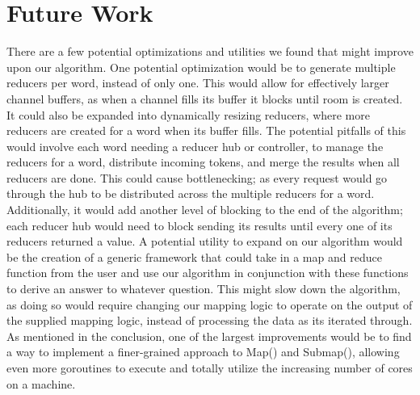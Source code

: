 \documentclass[report]{IEEEtran}
\begin{document}
\section{Future Work}

There are a few potential optimizations and utilities we found that might improve upon our algorithm. One potential optimization would be to generate multiple reducers per word, instead of only one. This would allow for effectively larger channel buffers, as when a channel fills its buffer it blocks until room is created. It could also be expanded into dynamically resizing reducers, where more reducers are created for a word when its buffer fills. The potential pitfalls of this would involve each word needing a reducer hub or controller, to manage the reducers for a word, distribute incoming tokens, and merge the results when all reducers are done. This could cause bottlenecking; as every request would go through the hub to be distributed across the multiple reducers for a word. Additionally, it would add another level of blocking to the end of the algorithm; each reducer hub would need to block sending its results until every one of its reducers returned a value. A potential utility to expand on our algorithm would be the creation of a generic framework that could take in a map and reduce function from the user and use our algorithm in conjunction with these functions to derive an answer to whatever question. This might slow down the algorithm, as doing so would require changing our mapping logic to operate on the output of the supplied mapping logic, instead of processing the data as its iterated through. As mentioned in the conclusion, one of the largest improvements would be to find a way to implement a finer-grained approach to Map() and Submap(), allowing even more goroutines to execute and totally utilize the increasing number of cores on a machine.



%
\end{document}
